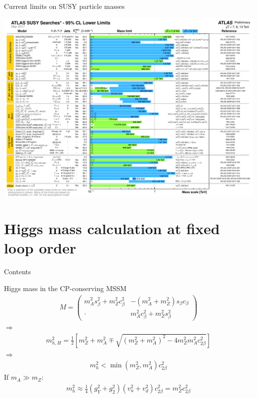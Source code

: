 \documentclass[hyperref={pdfpagelabels=false},ngerman]{beamer}
\begin{document}
\begin{frame}{Current limits on SUSY particle masses}
  \begin{center}
    \includegraphics[width=\textwidth]{images/ATLAS_SUSY_Summary}
  \end{center}
\end{frame}


\section{Higgs mass calculation at fixed loop order}

\begin{frame}{Contents}
  \tableofcontents[currentsection]  
\end{frame}

\begin{frame}{Higgs mass in the CP-conserving MSSM}
  \begin{align*}
    M =
    \begin{pmatrix}
      m_A^2 s_\beta^2 + m_Z^2 c_\beta^2 & -(m_A^2 + m_Z^2) s_\beta c_\beta \\
      \cdot & m_A^2 c_\beta^2 + m_Z^2 s_\beta^2
    \end{pmatrix}
  \end{align*}
  $\Rightarrow$
  \begin{align*}
    m_{h,H}^2 = \frac{1}{2} \left[
      m_Z^2 + m_A^2 \mp \sqrt{(m_Z^2 + m_A^2)^2 - 4 m_Z^2 m_A^2 c_{2\beta}^2}
    \right]
  \end{align*}
  $\Rightarrow$
  \begin{align*}
    m_h^2 < \min(m_Z^2, m_A^2) c_{2\beta}^2
  \end{align*}
  If $m_A \gg m_Z$:
  \begin{align*}
    m_h^2 \approx \frac{1}{4} (g_Y^2 + g_2^2) (v_u^2 + v_d^2) c_{2\beta}^2
    = m_Z^2 c_{2\beta}^2
  \end{align*}
\end{frame}
\end{document}
